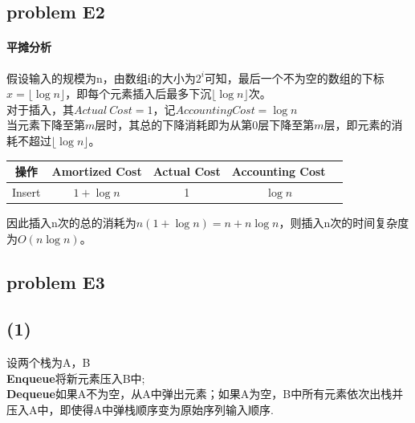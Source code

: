\documentclass[11pt]{ctexart}
\begin{document}
	\subsection*{problem E2}
	\paragraph{平摊分析} 假设输入的规模为n，由数组i的大小为$2^i$可知，最后一个不为空的数组的下标$x=\lfloor\log n\rfloor$，即每个元素插入后最多下沉$\lfloor\log n\rfloor$次。\\
	对于插入，其$Actual\ Cost=1$，记$Accounting Cost=\log n$\\
	当元素下降至第$m$层时，其总的下降消耗即为从第0层下降至第$m$层，即元素的消耗不超过$\lfloor\log n\rfloor$。\\

	\begin{table}[h]

	\begin{tabular}{|c|c|c|c|c}
		\hline
		\textbf{操作}& \textbf{Amortized Cost} & \textbf{Actual Cost} & \textbf{Accounting Cost}\\
		\hline
		Insert & $1+\log n$ & 1 & $\log n$ \\
		\hline
	\end{tabular}
	\end{table}
	\par
	因此插入n次的总的消耗为$n(1+\log n)=n+n\log n$，则插入n次的时间复杂度为$O(n\log n)$。
	\newpage
	\subsection*{problem E3}
	\subsection*{(1)} 设两个栈为A，B\\
	\textbf{Enqueue}将新元素压入B中;\\
	\textbf{Dequeue}如果A不为空，从A中弹出元素；如果A为空，B中所有元素依次出栈并压入A中，即使得A中弹栈顺序变为原始序列输入顺序.
\end{document}
